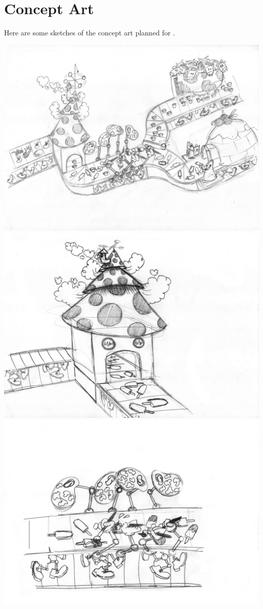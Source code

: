 \documentclass{sigchi}
\begin{document}
\section{Concept Art}
    Here are some sketches of the concept art planned for \gamename.
    \begin{center}
        \includegraphics[width=0.9\columnwidth]{01}
        \includegraphics[width=0.9\columnwidth]{02}
        \includegraphics[width=0.9\columnwidth]{03}

\end{center}
\end{document}
